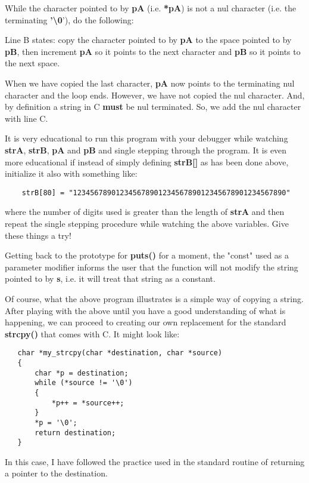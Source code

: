 While the character pointed to by \textbf{pA} (i.e. \textbf{*pA}) is not
a nul character (i.e. the terminating \textbf{'\textbackslash0}'), do
the following:

Line B states: copy the character pointed to by \textbf{pA} to the space
pointed to by \textbf{pB}, then increment \textbf{pA} so it points to
the next character and \textbf{pB} so it points to the next space.

When we have copied the last character, \textbf{pA} now points to the
terminating nul character and the loop ends. However, we have not copied
the nul character. And, by definition a string in C \textbf{must} be nul
terminated. So, we add the nul character with line C.

It is very educational to run this program with your debugger while
watching \textbf{strA}, \textbf{strB}, \textbf{pA} and \textbf{pB} and
single stepping through the program. It is even more educational if
instead of simply defining \textbf{strB{[}{]}} as has been done above,
initialize it also with something like:

\begin{verbatim}
    strB[80] = "12345678901234567890123456789012345678901234567890"
\end{verbatim}

where the number of digits used is greater than the length of
\textbf{strA} and then repeat the single stepping procedure while
watching the above variables. Give these things a try!

Getting back to the prototype for \textbf{puts()} for a moment, the
"const" used as a parameter modifier informs the user that the function
will not modify the string pointed to by \textbf{s}, i.e. it will treat
that string as a constant.

Of course, what the above program illustrates is a simple way of copying
a string. After playing with the above until you have a good
understanding of what is happening, we can proceed to creating our own
replacement for the standard \textbf{strcpy()} that comes with C. It
might look like:

\begin{verbatim}
   char *my_strcpy(char *destination, char *source)
   {
       char *p = destination;
       while (*source != '\0')
       {
           *p++ = *source++;
       }
       *p = '\0';
       return destination;
   }   
\end{verbatim}

In this case, I have followed the practice used in the standard routine
of returning a pointer to the destination.


